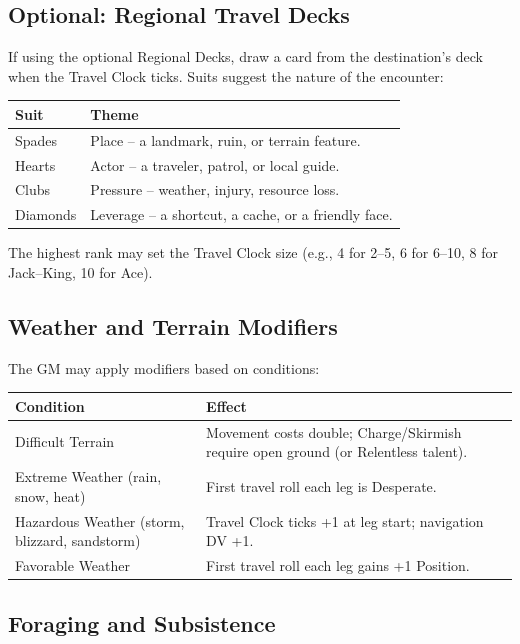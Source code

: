 \subsection{Optional: Regional Travel Decks}

If using the optional Regional Decks, draw a card from the destination's deck when the Travel Clock ticks. Suits suggest the nature of the encounter:

\begin{tabular}{@{}ll@{}}
\toprule
\textbf{Suit} & \textbf{Theme} \\
\midrule
Spades & Place – a landmark, ruin, or terrain feature. \\
Hearts & Actor – a traveler, patrol, or local guide. \\
Clubs & Pressure – weather, injury, resource loss. \\
Diamonds & Leverage – a shortcut, a cache, or a friendly face. \\
\bottomrule
\end{tabular}

The highest rank may set the Travel Clock size (e.g., 4 for 2–5, 6 for 6–10, 8 for Jack–King, 10 for Ace).

\subsection{Weather and Terrain Modifiers}

The GM may apply modifiers based on conditions:

\begin{tabular}{@{}ll@{}}
\toprule
\textbf{Condition} & \textbf{Effect} \\
\midrule
Difficult Terrain & Movement costs double; Charge/Skirmish require open ground (or Relentless talent). \\
Extreme Weather (rain, snow, heat) & First travel roll each leg is Desperate. \\
Hazardous Weather (storm, blizzard, sandstorm) & Travel Clock ticks +1 at leg start; navigation DV +1. \\
Favorable Weather & First travel roll each leg gains +1 Position. \\
\bottomrule
\end{tabular}

\subsection{Foraging and Subsistence}

